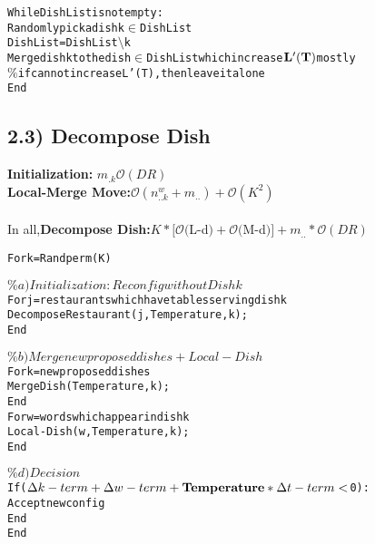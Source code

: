 \documentclass{article}
\begin{document}
\begin{spacing}{1.1}
\begin{alltt}
While Dish List is not empty:
    Randomly pick a dish k\(\in\) Dish List
    Dish List=Dish List\(\setminus\)k
    Merge dish k to the dish\(\in\) Dish List which increase \({\bf L'(T)}\) mostly
    \(\%\)if cannot increase L'(T), then leave it alone
End
 
\end{alltt}

\subsection{2.3) Decompose Dish}
{\bf Initialization:}  $m_{.k}\mathcal{O}(DR)$\\
{\bf Local-Merge Move:}$\mathcal{O}(n_{..k}^{w}+m_{..})+\mathcal{O}(K^{2})$\\ \\
In all,{\bf Decompose Dish:}$K*[\mathcal{O}($L-d$)+\mathcal{O}($M-d$)] +m_{..}*\mathcal{O}(DR)$
\begin{alltt}
For k=Randperm(K)

   \(\%a)Initialization: Reconfig without Dish k\)
      For j=restaurants which have tables serving dish k
          Decompose Restaurant(j,Temperature,k);
      End

   \(\%b)Merge new proposed dishes+Local-Dish\)
      For k=new proposed dishes
          Merge Dish(Temperature,k);
      End     
      For w=words which appear in dish k
          Local-Dish(w,Temperature,k);
      End 

   \(\%d)Decision\)
      If(\(\Delta k-term+\Delta w-term+{\bf Temperature}*\Delta t-term<\)0):
          Accept new config
      End
End
\end{alltt}
\end{spacing}
\end{document}
